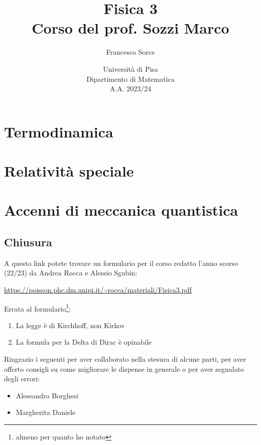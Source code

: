 \documentclass[a4paper]{report}
\title{Fisica 3\\
\large Corso del prof. Sozzi Marco}
\author{Francesco Sorce}
\date{Università di Pisa\\
Dipartimento di Matematica\\
A.A. 2023/24}
\begin{document}
\maketitle

\tableofcontents
\newpage


\part{Termodinamica}








\part{Relativit\`a speciale}




\part{Accenni di meccanica quantistica}







\appendix


\chapter{Chiusura}
A questo link potete trovare un formulario per il corso redatto l'anno scorso (22/23) da Andrea Rocca e Alessio Sgubin:
\begin{center}
\url{https://poisson.phc.dm.unipi.it/~rocca/materiali/Fisica3.pdf}
\end{center}

\bigskip 

\noindent Errata al formulario\footnote{almeno per quanto ho notato}:
\begin{enumerate}
\item La legge \`e di Kirchhoff, non Kirkov
\item La formula per la Delta di Dirac \`e opinabile
\end{enumerate}

\vspace*{1cm}

\noindent
Ringrazio i seguenti per aver collaborato nella stesura di alcune parti, per aver offerto consigli su come migliorare le dispense in generale o per aver segnalato degli errori:
\begin{itemize}
\item Alessandro Borghesi
\item Margherita Daniele
\end{itemize}
\end{document}
